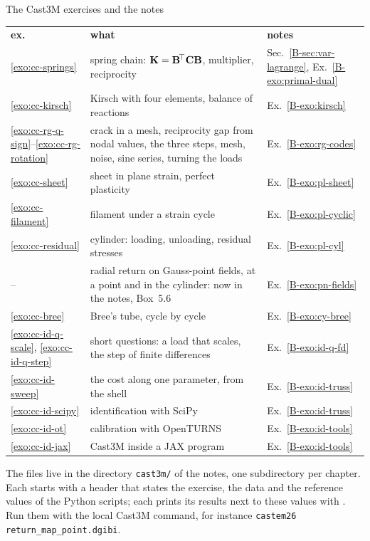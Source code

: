 \begin{gbox}{The Cast3M exercises and the notes}\label{cc:tab-list}
\small
\begin{tabular}{@{}l@{\hspace{3mm}}p{84mm}@{\hspace{3mm}}l@{}}
\textbf{ex.} & \textbf{what} & \textbf{notes}\\[1mm]
\ref{exo:cc-springs} & spring chain: $\mathbf{K}=\mathbf{B}^{\!\top}\mathbf{C}\mathbf{B}$, multiplier, reciprocity
     & Sec.~\ref{B-sec:var-lagrange}, Ex.~\ref{B-exo:primal-dual}\\
\ref{exo:cc-kirsch} & Kirsch with four elements, balance of reactions & Ex.~\ref{B-exo:kirsch}\\
\ref{exo:cc-rg-q-sign}--\ref{exo:cc-rg-rotation} & crack in a mesh, reciprocity gap from nodal values, the three steps, mesh, noise, sine series, turning the loads & Ex.~\ref{B-exo:rg-codes}\\
\ref{exo:cc-sheet} & sheet in plane strain, perfect plasticity & Ex.~\ref{B-exo:pl-sheet}\\
\ref{exo:cc-filament} & filament under a strain cycle & Ex.~\ref{B-exo:pl-cyclic}\\
\ref{exo:cc-residual} & cylinder: loading, unloading, residual stresses & Ex.~\ref{B-exo:pl-cyl}\\
-- & radial return on Gauss-point fields, at a point and in the cylinder: now in the notes, Box~5.6 & Ex.~\ref{B-exo:pn-fields}\\
\ref{exo:cc-bree} & Bree's tube, cycle by cycle & Ex.~\ref{B-exo:cy-bree}\\
\ref{exo:cc-id-q-scale}, \ref{exo:cc-id-q-step} & short questions: a load that scales, the step of finite differences & Ex.~\ref{B-exo:id-q-fd}\\
\ref{exo:cc-id-sweep} & the cost along one parameter, from the shell & Ex.~\ref{B-exo:id-truss}\\
\ref{exo:cc-id-scipy} & identification with SciPy & Ex.~\ref{B-exo:id-truss}\\
\ref{exo:cc-id-ot} & calibration with OpenTURNS & Ex.~\ref{B-exo:id-tools}\\
\ref{exo:cc-id-jax} & Cast3M inside a JAX program & Ex.~\ref{B-exo:id-tools}\\
\end{tabular}
\end{gbox}

\noindent The files live in the directory \texttt{cast3m/} of the notes, one
subdirectory per chapter. Each starts with a header that states the exercise,
the data and the reference values of the Python scripts; each prints its
results next to these values with . Run them with the local Cast3M
command, for instance \texttt{castem26 return\_map\_point.dgibi}.

